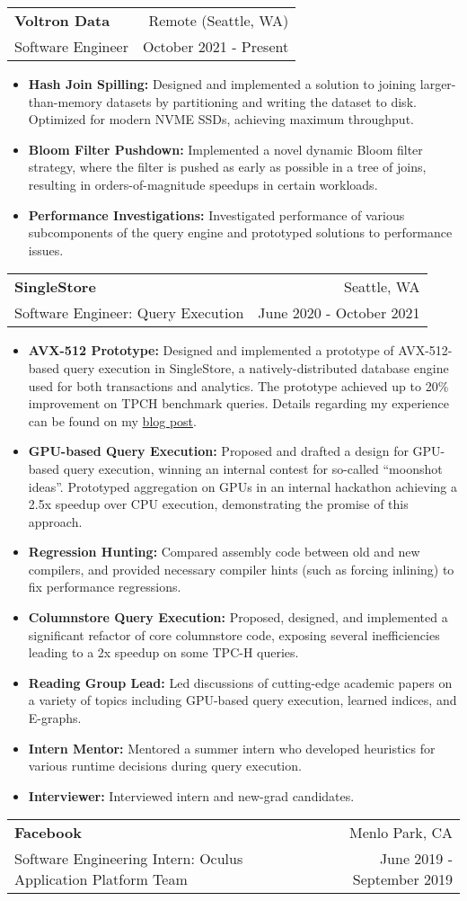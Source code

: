 \documentclass[letterpaper,11pt]{article}
\makeatletter
\newcommand{\resumeItem}[2]{
\vspace{-3pt}
\item\small{
    \textbf{#1}{\textbf{:} #2 \vspace{-2pt}}
  }
}
\newcommand{\resumeSubheading}[4]{
  \vspace{4pt}
  \begin{tabular*}{0.97\textwidth}{l@{\extracolsep{\fill}}r}
    \textbf{#1} & #2 \\
    {\small#3} & {\small #4} \\
  \end{tabular*}\vspace{-5pt}
}
\newcommand{\resumeItemListStart}{\vspace{3pt}\begin{itemize}}
\newcommand{\resumeItemListEnd}{\end{itemize}\vspace{-5pt}}
\makeatother
\begin{document}
\resumeSubheading{Voltron Data}{Remote (Seattle, WA)}
{Software Engineer}{October 2021 - Present}
\resumeItemListStart
\resumeItem{Hash Join Spilling}
{Designed and implemented a solution to joining larger-than-memory datasets by partitioning
  and writing the dataset to disk. Optimized for modern NVME SSDs, achieving maximum throughput.}
\resumeItem{Bloom Filter Pushdown}
{Implemented a novel dynamic Bloom filter strategy, where the filter is pushed as early as possible
  in a tree of joins, resulting in orders-of-magnitude speedups in certain workloads.}
\resumeItem{Performance Investigations}
{Investigated performance of various subcomponents of the query engine and prototyped solutions
  to performance issues.}
\resumeItemListEnd
\vspace{2pt}
\resumeSubheading{SingleStore}{Seattle, WA}
{Software Engineer: Query Execution}{June 2020 - October 2021}
\resumeItemListStart
\resumeItem{AVX-512 Prototype}
{Designed and implemented a prototype of AVX-512-based query execution in SingleStore, a
  natively-distributed database engine used for both transactions and analytics. The prototype
  achieved up to 20\% improvement on TPCH benchmark queries. Details regarding my experience
  can be found on my
  \href{https://www.singlestore.com/blog/a-programmers-perspective/}{blog post}.}
\resumeItem{GPU-based Query Execution}
{Proposed and drafted a design for GPU-based query execution, winning an internal contest
  for so-called ``moonshot ideas''. Prototyped aggregation on GPUs in an internal hackathon
  achieving a 2.5x speedup over CPU execution, demonstrating the promise of this approach.}
\resumeItem{Regression Hunting}
{Compared assembly code between old and new compilers, and provided necessary compiler hints
  (such as forcing inlining) to fix performance regressions.}
\resumeItem{Columnstore Query Execution}
{Proposed, designed, and implemented a significant refactor of core columnstore code,
  exposing several inefficiencies leading to a 2x speedup on some TPC-H queries.}
\resumeItem{Reading Group Lead}
{Led discussions of cutting-edge academic papers on a variety of topics including GPU-based
  query execution, learned indices, and E-graphs.}
\resumeItem{Intern Mentor}
{Mentored a summer intern who developed heuristics for various runtime decisions during
  query execution.}
\resumeItem{Interviewer}
{Interviewed intern and new-grad candidates.}
\resumeItemListEnd
\vspace{2pt}
\resumeSubheading
{Facebook}{Menlo Park, CA}
{Software Engineering Intern: Oculus Application Platform Team}{June 2019 - September 2019}
\end{document}
